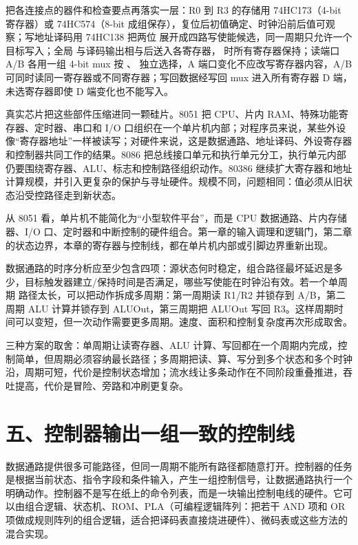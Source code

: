 把各连接点的器件和检查要点再落实一层：R0 到 R3 的存储用 74HC173（4-bit 寄存器）或 74HC574（8-bit 成组保存），复位后初值确定、时钟沿前后值可观察；写地址译码用 74HC138 把两位  展开成四路写使能候选，同一周期只允许一个目标写入；全局  与译码输出相与后送入各寄存器， 时所有寄存器保持；读端口 A/B 各用一组 4-bit mux 按 、 独立选择，A 端口变化不应改写寄存器内容，A/B 可同时读同一寄存器或不同寄存器；写回数据经写回 mux 进入所有寄存器 D 端，未选寄存器即使 D 端变化也不能写入。

真实芯片把这些部件压缩进同一颗硅片。8051 把 CPU、片内 RAM、特殊功能寄存器、定时器、串口和 I/O 口组织在一个单片机内部；对程序员来说，某些外设像“寄存器地址”一样被读写；对硬件来说，这是数据通路、地址译码、外设寄存器和控制器共同工作的结果。8086 把总线接口单元和执行单元分工，执行单元内部仍要围绕寄存器、ALU、标志和控制路径组织动作。80386 继续扩大寄存器和地址计算规模，并引入更复杂的保护与寻址硬件。规模不同，问题相同：值必须从旧状态沿受控路径走到新状态。

\begin{chipcase}
从 8051 看，单片机不能简化为“小型软件平台”，而是 CPU 数据通路、片内存储器、I/O 口、定时器和中断控制的硬件组合。第一章的输入调理和逻辑门，第二章的状态边界，本章的寄存器与控制线，都在单片机内部或引脚边界重新出现。
\end{chipcase}

数据通路的时序分析应至少包含四项：源状态何时稳定，组合路径最坏延迟是多少，目标触发器建立/保持时间是否满足，哪些写使能在时钟沿有效。若一个单周期  路径太长，可以把动作拆成多周期：第一周期读 R1/R2 并锁存到 A/B，第二周期 ALU 计算并锁存到 ALUOut，第三周期把 ALUOut 写回 R3。这样周期时间可以变短，但一次动作需要更多周期。速度、面积和控制复杂度再次形成取舍。

三种方案的取舍：单周期让读寄存器、ALU 计算、写回都在一个周期内完成，控制简单，但周期必须容纳最长路径；多周期把读、算、写分到多个状态和多个时钟沿，周期可短，代价是控制状态增加；流水线让多条动作在不同阶段重叠推进，吞吐提高，代价是冒险、旁路和冲刷更复杂。

\section{五、控制器输出一组一致的控制线}

数据通路提供很多可能路径，但同一周期不能所有路径都随意打开。控制器的任务是根据当前状态、指令字段和条件输入，产生一组控制信号，让数据通路执行一个明确动作。控制器不是写在纸上的命令列表，而是一块输出控制电线的硬件。它可以由组合逻辑、状态机、ROM、PLA（可编程逻辑阵列：把若干 AND 项和 OR 项做成规则阵列的组合逻辑，适合把译码表直接烧进硬件）、微码表或这些方法的混合实现。

